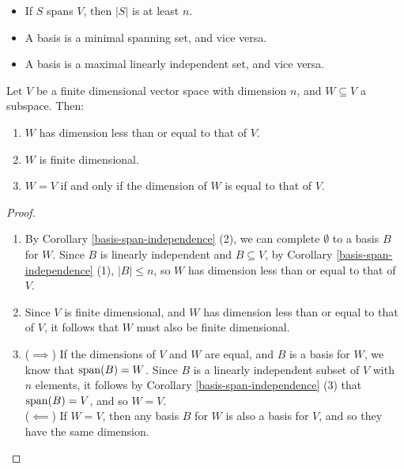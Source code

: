 \begin{rmk}\proofbreak
    \begin{itemize}
        \item If $S$ spans $V$, then $|S|$ is at least $n$.
        \item A basis is a minimal spanning set, and vice versa.
        \item A basis is a maximal linearly independent set, and vice versa.
    \end{itemize}
\end{rmk}

\begin{thm}\label{subspace-is-finite}
    Let $V$ be a finite dimensional vector space with dimension $n$, and $W \subseteq V$ a subspace. Then:
    \begin{enumerate}
        \item $W$ has dimension less than or equal to that of $V$.
        \item $W$ is finite dimensional.
        \item $W = V$ if and only if the dimension of $W$ is equal to that of $V$.
    \end{enumerate}
\end{thm}

\begin{proof}\proofbreak
    \begin{enumerate}
        \item By Corollary \ref{basis-span-independence} (2), we can complete $\emptyset$ to a basis $B$ for $W$. Since $B$ is linearly independent and $B \subseteq V$, by Corollary \ref{basis-span-independence} (1), $|B| \leq n$, so $W$ has dimension less than or equal to that of $V$.
        \item Since $V$ is finite dimensional, and $W$ has dimension less than or equal to that of $V$, it follows that $W$ must also be finite dimensional.
        \item ($\implies$) If the dimensions of $V$ and $W$ are equal, and $B$ is a basis for $W$, we know that $\operatorname{span}(B) = W$. Since $B$ is a linearly independent subset of $V$ with $n$ elements, it follows by Corollary \ref{basis-span-independence} (3) that $\operatorname{span}(B) = V$, and so $W = V$. \\ ($\impliedby$) If $W = V$, then any basis $B$ for $W$ is also a basis for $V$, and so they have the same dimension.
    \end{enumerate}
\end{proof}

